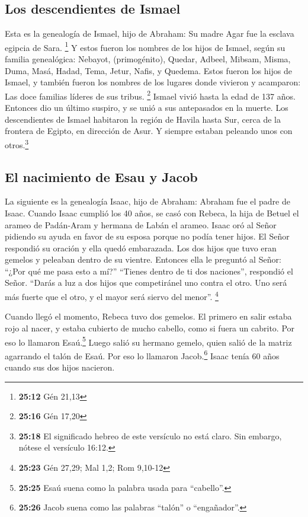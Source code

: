 \hypertarget{los-descendientes-de-ismael}{%
\subsection{Los descendientes de
Ismael}\label{los-descendientes-de-ismael}}

 Esta es la genealogía de Ismael, hijo de Abraham: Su
madre Agar fue la esclava egipcia de Sara. \footnote{\textbf{25:12} Gén
  21,13}  Y estos fueron los nombres de los hijos de
Ismael, según su familia genealógica: Nebayot, (primogénito), Quedar,
Adbeel, Mibsam,  Misma, Duma, Masá, 
Hadad, Tema, Jetur, Nafis, y Quedema.  Estos fueron los
hijos de Ismael, y también fueron los nombres de los lugares donde
vivieron y acamparon: Las doce familias líderes de sus tribus.
\footnote{\textbf{25:16} Gén 17,20}  Ismael vivió hasta
la edad de 137 años. Entonces dio un último suspiro, y se unió a sus
antepasados en la muerte.  Los descendientes de Ismael
habitaron la región de Havila hasta Sur, cerca de la frontera de Egipto,
en dirección de Asur. Y siempre estaban peleando unos con
otros.\footnote{\textbf{25:18} El significado hebreo de este versículo
  no está claro. Sin embargo, nótese el versículo 16:12.}

\hypertarget{el-nacimiento-de-esau-y-jacob}{%
\subsection{El nacimiento de Esau y
Jacob}\label{el-nacimiento-de-esau-y-jacob}}

 La siguiente es la genealogía Isaac, hijo de Abraham:
Abraham fue el padre de Isaac.  Cuando Isaac cumplió los
40 años, se casó con Rebeca, la hija de Betuel el arameo de Padán-Aram y
hermana de Labán el arameo.  Isaac oró al Señor pidiendo
su ayuda en favor de su esposa porque no podía tener hijos. El Señor
respondió su oración y ella quedó embarazada.  Los dos
hijos que tuvo eran gemelos y peleaban dentro de su vientre. Entonces
ella le preguntó al Señor: ``¿Por qué me pasa esto a mí?''
 ``Tienes dentro de ti dos naciones'', respondió el
Señor. ``Darás a luz a dos hijos que competiránel uno contra el otro.
Uno será más fuerte que el otro, y el mayor será siervo del menor''.
\footnote{\textbf{25:23} Gén 27,29; Mal 1,2; Rom 9,10-12}

 Cuando llegó el momento, Rebeca tuvo dos gemelos.
 El primero en salir estaba rojo al nacer, y estaba
cubierto de mucho cabello, como si fuera un cabrito. Por eso lo llamaron
Esaú.\footnote{\textbf{25:25} Esaú suena como la palabra usada para
  ``cabello''.}  Luego salió su hermano gemelo, quien
salió de la matriz agarrando el talón de Esaú. Por eso lo llamaron
Jacob.\footnote{\textbf{25:26} Jacob suena como las palabras ``talón'' o
  ``engañador''.} Isaac tenía 60 años cuando sus dos hijos nacieron.

